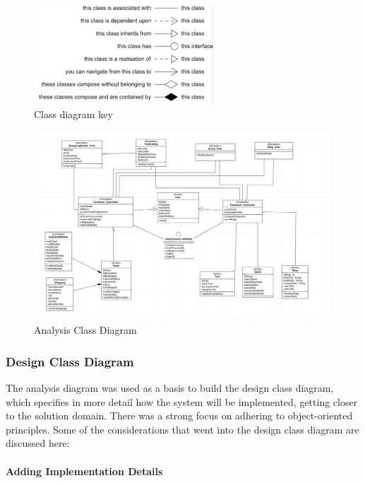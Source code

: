 \begin{figure}[H]
      \centering
      \includegraphics[trim = 0 0 0 0, clip, width=0.6\textwidth]{TempImg/DClassKey.png}
      \caption{Class diagram key}
 \end{figure}

\begin{figure}[H]
      \centering
      \includegraphics[trim = 0 0 0 0, clip, width=0.99\textwidth]{TempImg/AClass.png}
      \caption{Analysis Class Diagram}
 \end{figure}

\hypertarget{design-class-diagram}{%
\subsubsection{Design Class Diagram}\label{design-class-diagram}}

The analysis diagram was used as a basis to build the design class
diagram, which specifies in more detail how the system will be
implemented, getting closer to the solution domain. There was a strong
focus on adhering to object-oriented principles. Some of the
considerations that went into the design class diagram are discussed
here:

\hypertarget{adding-implementation-details}{%
\paragraph{Adding Implementation
Details}\label{adding-implementation-details}}

